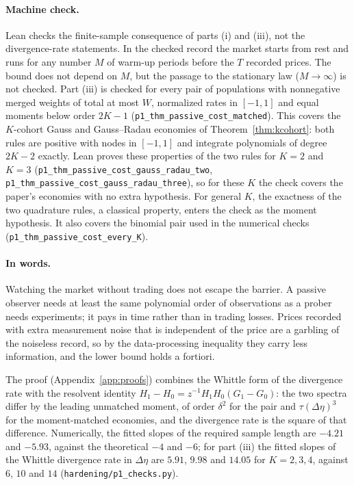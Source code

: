 \documentclass[12pt]{article}
\theoremstyle{definition}
\theoremstyle{remark}
\begin{document}
\paragraph{Machine check.} Lean checks the finite-sample consequence of parts (i) and (iii), not the divergence-rate statements. In the checked record the market starts from rest and runs for any number $M$ of warm-up periods before the $T$ recorded prices. The bound does not depend on $M$, but the passage to the stationary law ($M\to\infty$) is not checked. Part (iii) is checked for every pair of populations with nonnegative merged weights of total at most $W$, normalized rates in $[-1,1]$ and equal moments below order $2K-1$ (\texttt{p1\_thm\_passive\_cost\_matched}). This covers the $K$-cohort Gauss and Gauss--Radau economies of Theorem~\ref{thm:kcohort}: both rules are positive with nodes in $[-1,1]$ and integrate polynomials of degree $2K-2$ exactly. Lean proves these properties of the two rules for $K=2$ and $K=3$ (\texttt{p1\_thm\_passive\_cost\_gauss\_radau\_two}, \texttt{p1\_thm\_passive\_cost\_gauss\_radau\_three}), so for these $K$ the check covers the paper's economies with no extra hypothesis. For general $K$, the exactness of the two quadrature rules, a classical property, enters the check as the moment hypothesis. It also covers the binomial pair used in the numerical checks (\texttt{p1\_thm\_passive\_cost\_every\_K}).

\paragraph{In words.} Watching the market without trading does not escape the barrier. A passive observer needs at least the same polynomial order of observations as a prober needs experiments; it pays in time rather than in trading losses. Prices recorded with extra measurement noise that is independent of the price are a garbling of the noiseless record, so by the data-processing inequality they carry less information, and the lower bound holds a fortiori.


The proof (Appendix~\ref{app:proofs}) combines the Whittle form of the divergence rate with the resolvent identity $H_1-H_0=z^{-1}H_1H_0(G_1-G_0)$: the two spectra differ by the leading unmatched moment, of order $\delta^2$ for the pair and $\tau(\Delta\eta)^3$ for the moment-matched economies, and the divergence rate is the square of that difference. Numerically, the fitted slopes of the required sample length are $-4.21$ and $-5.93$, against the theoretical $-4$ and $-6$; for part (iii) the fitted slopes of the Whittle divergence rate in $\Delta\eta$ are $5.91$, $9.98$ and $14.05$ for $K=2,3,4$, against $6$, $10$ and $14$ (\texttt{hardening/p1\_checks.py}).
\end{document}
